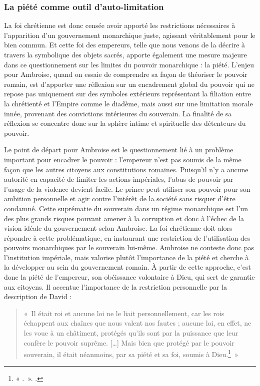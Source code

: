 \bigskip

\subsubsection{La piété comme outil d'auto-limitation}

La foi chrétienne est donc censée avoir apporté les restrictions nécessaires à l’apparition d'un gouvernement monarchique juste, agissant véritablement pour le bien commun. Et cette foi des empereurs, telle que nous venons de la décrire à travers la symbolique des objets sacrés, apporte également une mesure majeure dans ce questionnement sur les limites du pouvoir monarchique : la piété. L'enjeu pour Ambroise, quand on essaie de comprendre sa façon de théoriser le pouvoir romain, est d'apporter une réflexion sur un encadrement global du pouvoir qui ne repose pas uniquement sur des symboles extérieurs représentant la filiation entre la chrétienté et l'Empire comme le diadème, mais aussi sur une limitation morale innée, provenant des convictions intérieures du souverain. La finalité de sa réflexion se concentre donc sur la sphère intime et spirituelle des détenteurs du pouvoir.

\bigskip

Le point de départ pour Ambroise est le questionnement lié à un problème important pour encadrer le pouvoir : l'empereur n'est pas soumis de la même façon que les autres citoyens aux constitutions romaines. Puisqu'il n'y a aucune autorité en capacité de limiter les actions impériales, l'abus de pouvoir par l'usage de la violence devient facile. Le prince peut utiliser son pouvoir pour son ambition personnelle et agir contre l'intérêt de la société sans risquer d'être condamné. Cette suprématie du souverain dans un régime monarchique est l'un des plus grands risques pouvant amener à la corruption et donc à l'échec de la vision idéale du gouvernement selon Ambroise. La foi chrétienne doit alors répondre à cette problématique, en instaurant une restriction de l'utilisation des pouvoirs monarchiques par le souverain lui-même. Ambroise ne conteste donc pas l'institution impériale, mais valorise plutôt l'importance de la piété et cherche à la développer au sein du gouvernement romain. À partir de cette approche, c'est donc la piété de l'empereur, son obéissance volontaire à Dieu, qui sert de garantie aux citoyens. Il accentue l'importance de la restriction personnelle par la description de David :

\bigskip

\begin{quote}
    «~Il était roi et aucune loi ne le liait personnellement, car les rois échappent aux chaînes que nous valent nos fautes ; aucune loi, en effet, ne les voue à un châtiment, protégés qu’ils sont par la puissance que leur confère le pouvoir suprême. […] Mais bien que protégé par le pouvoir souverain, il était néanmoins, par sa piété et sa foi, soumis à Dieu.\footnote{« .~». \cite[\nopp X, 51]{ambroise_apologie_david}.}~»
\end{quote}

